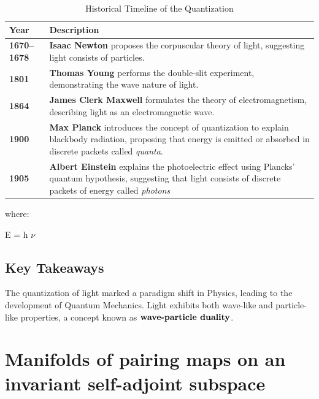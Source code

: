 \documentclass[a4paper, 10pt, onepage]{elegantbook}
\begin{document}
{\begin{table}[ht]
\centering
\caption{Historical Timeline of the Quantization}
\label{tab:quantization}
\begin{tabular}{|l|p{6cm}|}
\hline
\textbf{Year} & \textbf{Description} \\ \hline
\textbf{1670--1678}          &  \textbf{Isaac Newton} proposes the corpuscular theory of light, suggesting light consists of particles.  \\ \hline    \textbf{1801}                &  \textbf{Thomas Young} performs the double-slit experiment, demonstrating the wave nature of light. \\    \hline
\textbf{1864}                &  \textbf{James Clerk Maxwell} formulates the theory of electromagnetism, describing light as an electromagnetic wave.  \\ \hline
\textbf{1900}                &  \textbf{Max Planck} introduces the concept of quantization to explain blackbody radiation, proposing that energy is emitted or absorbed in discrete packets called \textit{quanta}. \\  \hline
\textbf{1905}                &  \textbf{Albert Einstein} explains the photoelectric effect using Plancks' quantum hypothesis, suggesting that light consists of discrete packets of energy called \textit{photons}  \\  \hline
\end{tabular}
\end{table}

where:  \\
\noindent

E = h $\nu$ \\


\subsection{Key Takeaways}

The quantization of light marked a paradigm shift in Physics, leading to the development of Quantum Mechanics. Light exhibits both wave-like and particle-like properties, a concept known as $\textbf{wave-particle duality\index{wave-particle duality}}$.

\section{Manifolds of pairing maps on an invariant self-adjoint subspace} \label{sec:Manifolds of pairing maps on an invariant self-adjoint subspace}

}
\end{document}
